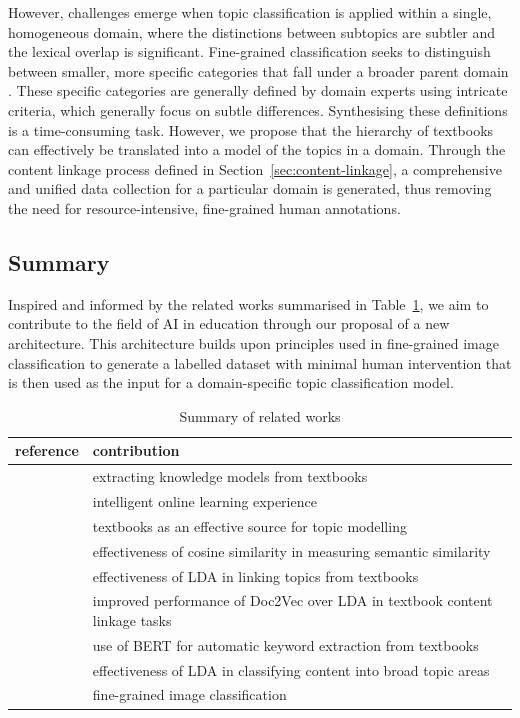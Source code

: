 \documentclass[twocolumn]{article}
\begin{document}
However, challenges emerge when topic classification is applied within a single, homogeneous domain, where the distinctions between subtopics are subtler and the lexical overlap is significant. Fine-grained classification seeks to distinguish between smaller, more specific categories that fall under a broader parent domain \cite{yang2018}. These specific categories are generally defined by domain experts using intricate criteria, which generally focus on subtle differences. Synthesising these definitions is a time-consuming task. However, we propose that the hierarchy of textbooks can effectively be translated into a model of the topics in a domain. Through the content linkage process defined in Section~\ref{sec:content-linkage}, a comprehensive and unified data collection for a particular domain is generated, thus removing the need for resource-intensive, fine-grained human annotations.

\subsection{Summary}

Inspired and informed by the related works summarised in Table~\ref{table:related-works}, we aim to contribute to the field of AI in education through our proposal of a new architecture. This architecture builds upon principles used in fine-grained image classification to generate a labelled dataset with minimal human intervention that is then used as the input for a domain-specific topic classification model.

\begin{table}[h!]
\centering
\caption{Summary of related works}
\label{table:related-works}
\small
\begin{tabular}{ll}
\toprule
reference & contribution \\
\midrule
\textcites{alpizarchacon2019,alpizarchacon2020, alpizarchacon2021,alpizarchacon2022} 
    & extracting knowledge models from textbooks \\
\textcite{alpizarchacon2020intextbooks} 
    & intelligent online learning experience \\
\textcite{ramnarayan2003} 
    & textbooks as an effective source for topic modelling \\
\textcite{bullinaria2007} 
    & effectiveness of cosine similarity in measuring semantic similarity \\
\textcite{guerra2013} 
    & effectiveness of LDA in linking topics from textbooks \\
\textcite{thaker2018} 
    & improved performance of Doc2Vec over LDA in textbook content linkage tasks \\
\textcite{alpizarchacon2023a} 
    & use of BERT for automatic keyword extraction from textbooks \\
\textcites{lancichinetti2014, li2016} 
    & effectiveness of LDA in classifying content into broad topic areas \\
\textcite{yang2018} 
    & fine-grained image classification \\
\bottomrule
\end{tabular}
\end{table}
\end{document}
